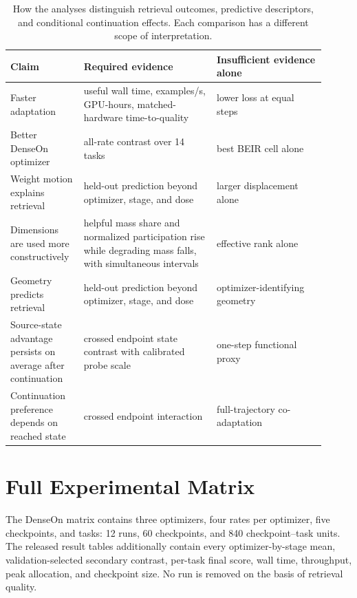 \documentclass[11pt]{article}
\begin{document}
\begin{table}[t]
\centering
\small
\begin{tabular}{p{0.20\linewidth}p{0.39\linewidth}p{0.32\linewidth}}
\toprule
Claim & Required evidence & Insufficient evidence alone \\
\midrule
Faster adaptation & useful wall time, examples/s, GPU-hours, matched-hardware time-to-quality & lower loss at equal steps \\
Better DenseOn optimizer & all-rate contrast over 14 tasks & best BEIR cell alone \\
Weight motion explains retrieval & held-out prediction beyond optimizer, stage, and dose & larger displacement alone \\
Dimensions are used more constructively & helpful mass share and normalized participation rise while degrading mass falls, with simultaneous intervals & effective rank alone \\
Geometry predicts retrieval & held-out prediction beyond optimizer, stage, and dose & optimizer-identifying geometry \\
Source-state advantage persists on average after continuation & crossed endpoint state contrast with calibrated probe scale & one-step functional proxy \\
Continuation preference depends on reached state & crossed endpoint interaction & full-trajectory co-adaptation \\
\bottomrule
\end{tabular}
\caption{How the analyses distinguish retrieval outcomes, predictive descriptors, and conditional
continuation effects. Each comparison has a different scope of interpretation.}
\label{tab:claim-firewall}
\end{table}

\section{Full Experimental Matrix}

The DenseOn matrix contains three optimizers, four rates per optimizer, five
checkpoints, and \NumBEIRTasks{} tasks: 12 runs, 60 checkpoints, and 840 checkpoint--task units.
The released result tables additionally contain every optimizer-by-stage mean, validation-selected
secondary contrast, per-task final score, wall time, throughput, peak allocation, and checkpoint
size. No run is removed on the basis of retrieval quality.
\end{document}

